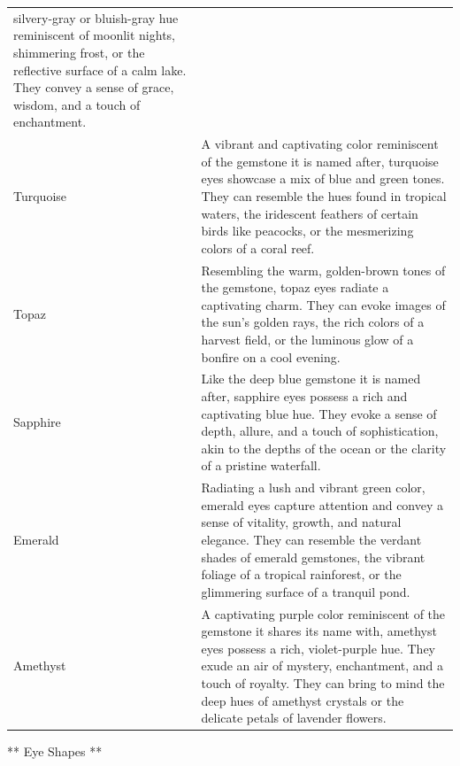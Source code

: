 \begin{longtable}[]{@{}
  >{\raggedright\arraybackslash}p{}
  >{\raggedright\arraybackslash}p{}@{}}
silvery-gray or bluish-gray hue reminiscent of moonlit nights,
shimmering frost, or the reflective surface of a calm lake. They convey
a sense of grace, wisdom, and a touch of enchantment. \\
Turquoise & A vibrant and captivating color reminiscent of the gemstone
it is named after, turquoise eyes showcase a mix of blue and green
tones. They can resemble the hues found in tropical waters, the
iridescent feathers of certain birds like peacocks, or the mesmerizing
colors of a coral reef. \\
Topaz & Resembling the warm, golden-brown tones of the gemstone, topaz
eyes radiate a captivating charm. They can evoke images of the sun's
golden rays, the rich colors of a harvest field, or the luminous glow of
a bonfire on a cool evening. \\
Sapphire & Like the deep blue gemstone it is named after, sapphire eyes
possess a rich and captivating blue hue. They evoke a sense of depth,
allure, and a touch of sophistication, akin to the depths of the ocean
or the clarity of a pristine waterfall. \\
Emerald & Radiating a lush and vibrant green color, emerald eyes capture
attention and convey a sense of vitality, growth, and natural elegance.
They can resemble the verdant shades of emerald gemstones, the vibrant
foliage of a tropical rainforest, or the glimmering surface of a
tranquil pond. \\
Amethyst & A captivating purple color reminiscent of the gemstone it
shares its name with, amethyst eyes possess a rich, violet-purple hue.
They exude an air of mystery, enchantment, and a touch of royalty. They
can bring to mind the deep hues of amethyst crystals or the delicate
petals of lavender flowers. \\
\bottomrule
\end{longtable}

** Eye Shapes **

